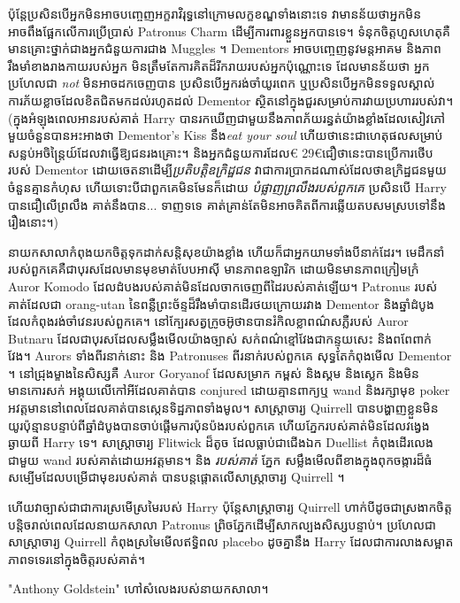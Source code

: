ប៉ុន្តែប្រសិនបើអ្នកមិនអាចបញ្ចេញអក្ខរាវិរុទ្ធនៅក្រោមលក្ខខណ្ឌទាំងនោះទេ វាមានន័យថាអ្នកមិនអាចពឹងផ្អែកលើការប្រើប្រាស់ Patronus Charm ដើម្បីការពារខ្លួនអ្នកបានទេ។ ទំនុកចិត្តហួសហេតុគឺមានគ្រោះថ្នាក់ជាងអ្នកជំនួយការជាង Muggles ។ Dementors អាចបញ្ចេញនូវមន្តអាគម និងភាពរឹងមាំខាងរាងកាយរបស់អ្នក មិនត្រឹមតែការគិតដ៏រីករាយរបស់អ្នកប៉ុណ្ណោះទេ ដែលមានន័យថា អ្នកប្រហែលជា \emph{not} មិនអាចដកចេញបាន ប្រសិនបើអ្នករង់ចាំយូរពេក ឬប្រសិនបើអ្នកមិនទទួលស្គាល់ការភ័យខ្លាចដែលខិតជិតមកដល់រហូតដល់ Dementor ស្ថិតនៅក្នុងជួរសម្រាប់ការវាយប្រហាររបស់វា។ (ក្នុងអំឡុងពេលអានរបស់គាត់ Harry បានរកឃើញជាមួយនឹងភាពភ័យរន្ធត់យ៉ាងខ្លាំងដែលសៀវភៅមួយចំនួនបានអះអាងថា Dementor's Kiss នឹង\emph{eat your soul} ហើយថានេះជាហេតុផលសម្រាប់សន្លប់អចិន្ត្រៃយ៍ដែលវាធ្វើឱ្យជនរងគ្រោះ។ និងអ្នកជំនួយការដែល€ 29€{ជឿថានេះ}បានប្រើការថើបរបស់ Dementor ដោយចេតនាដើម្បី\emph{ប្រតិបត្តិឧក្រិដ្ឋជន} វាជាការប្រាកដណាស់ដែលថាឧក្រិដ្ឋជនមួយចំនួនគ្មានកំហុស ហើយទោះបីជាពួកគេមិនមែនក៏ដោយ \emph{បំផ្លាញព្រលឹងរបស់ពួកគេ} ប្រសិនបើ Harry បានជឿលើព្រលឹង គាត់នឹងបាន... ទាញទទេ គាត់គ្រាន់តែមិនអាចគិតពីការឆ្លើយតបសមស្របទៅនឹងរឿងនោះ។)

នាយក​សាលា​កំពុង​យក​ចិត្ត​ទុក​ដាក់​សន្តិសុខ​យ៉ាង​ខ្លាំង ហើយ​ក៏​ជា​អ្នក​យាម​ទាំង​បី​នាក់​ដែរ។ មេដឹកនាំរបស់ពួកគេគឺជាបុរសដែលមានមុខមាត់បែបអាស៊ី មានភាពឧឡារិក ដោយមិនមានភាពក្រៀមក្រំ Auror Komodo ដែលដំបងរបស់គាត់មិនដែលចាកចេញពីដៃរបស់គាត់ឡើយ។ Patronus របស់គាត់ដែលជា orang-utan នៃពន្លឺព្រះច័ន្ទដ៏រឹងមាំបានដើរថយក្រោយរវាង Dementor និងឆ្នាំដំបូងដែលកំពុងរង់ចាំវេនរបស់ពួកគេ។ នៅ​ក្បែរ​សត្វ​ក្រូច​អ៊ូថាន​បាន​រំកិល​ខ្លា​ពណ៌​ស​ភ្លឺ​របស់ Auror Butnaru ដែល​ជា​បុរស​ដែល​សម្លឹង​មើល​យ៉ាង​ច្បាស់ សក់​ពណ៌​ខ្មៅ​វែង​ជា​កន្ទុយ​សេះ និង​ពពែ​ពាក់​វែង។ Aurors ទាំងពីរនាក់នោះ និង Patronuses ពីរនាក់របស់ពួកគេ សុទ្ធតែកំពុងមើល Dementor ។ នៅជ្រុងម្ខាងនៃសិស្សគឺ Auror Goryanof ដែលសម្រាក កម្ពស់ និងស្គម និងស្លេក និងមិនមានកោរសក់ អង្គុយលើកៅអីដែលគាត់បាន conjured ដោយគ្មានពាក្យឬ wand និងរក្សាមុខ poker អវត្តមាននៅពេលដែលគាត់បានស្កេនទិដ្ឋភាពទាំងមូល។ សាស្រ្តាចារ្យ Quirrell បានបង្ហាញខ្លួនមិនយូរប៉ុន្មានបន្ទាប់ពីឆ្នាំដំបូងបានចាប់ផ្តើមការប៉ុនប៉ងរបស់ពួកគេ ហើយភ្នែករបស់គាត់មិនដែលវង្វេងឆ្ងាយពី Harry ទេ។ សាស្ត្រាចារ្យ Flitwick ដ៏តូច ដែលធ្លាប់ជាជើងឯក Duellist កំពុងដើរលេងជាមួយ wand របស់គាត់ដោយអវត្តមាន។ និង \emph{របស់គាត់} ភ្នែក សម្លឹងមើលពីខាងក្នុងពុកចង្ការដ៏ធំសម្បើមដែលបម្រើជាមុខរបស់គាត់ បានបន្តផ្តោតលើសាស្រ្តាចារ្យ Quirrell ។

ហើយវាច្បាស់ជាជាការស្រមើស្រមៃរបស់ Harry ប៉ុន្តែសាស្រ្តាចារ្យ Quirrell ហាក់បីដូចជាស្រងាកចិត្តបន្តិចរាល់ពេលដែលនាយកសាលា Patronus ព្រិចភ្នែកដើម្បីសាកល្បងសិស្សបន្ទាប់។ ប្រហែលជាសាស្រ្តាចារ្យ Quirrell កំពុងស្រមៃមើលឥទ្ធិពល placebo ដូចគ្នានឹង Harry ដែលជាការលាងសម្អាតភាពទទេរនៅក្នុងចិត្តរបស់គាត់។

"Anthony Goldstein" ហៅសំលេងរបស់នាយកសាលា។

